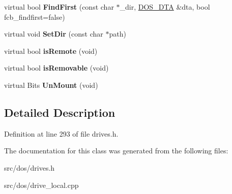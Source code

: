 \begin{DoxyCompactItemize}
\item 
\hypertarget{classcdromDrive_afd0347b272659c24f6f3cd9b7b05f89c}{virtual bool {\bfseries Find\-First} (const char $\ast$\-\_\-dir, \hyperlink{classDOS__DTA}{D\-O\-S\-\_\-\-D\-T\-A} \&dta, bool fcb\-\_\-findfirst=false)}\label{classcdromDrive_afd0347b272659c24f6f3cd9b7b05f89c}

\item 
\hypertarget{classcdromDrive_a3aeeb35dbd5100a4b973aa6341295521}{virtual void {\bfseries Set\-Dir} (const char $\ast$path)}\label{classcdromDrive_a3aeeb35dbd5100a4b973aa6341295521}

\item 
\hypertarget{classcdromDrive_a2186d681041aad9456c57cd4be5cc0bc}{virtual bool {\bfseries is\-Remote} (void)}\label{classcdromDrive_a2186d681041aad9456c57cd4be5cc0bc}

\item 
\hypertarget{classcdromDrive_ab96402d6d61617f26d545268e1127a07}{virtual bool {\bfseries is\-Removable} (void)}\label{classcdromDrive_ab96402d6d61617f26d545268e1127a07}

\item 
\hypertarget{classcdromDrive_a4e5d16dc2a6171b622ed815b464f1114}{virtual Bits {\bfseries Un\-Mount} (void)}\label{classcdromDrive_a4e5d16dc2a6171b622ed815b464f1114}

\end{DoxyCompactItemize}


\subsection{Detailed Description}


Definition at line 293 of file drives.\-h.



The documentation for this class was generated from the following files\-:\begin{DoxyCompactItemize}
\item 
src/dos/drives.\-h\item 
src/dos/drive\-\_\-local.\-cpp\end{DoxyCompactItemize}
